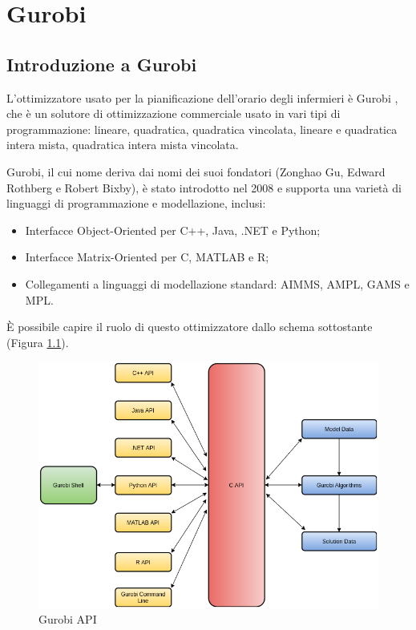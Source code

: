 \chapter{Gurobi}

\section{Introduzione a Gurobi}
L'ottimizzatore usato per la pianificazione dell'orario degli infermieri è Gurobi \cite{ref:Gurobi}, che è un solutore di ottimizzazione commerciale usato in vari tipi di programmazione: lineare, quadratica, quadratica vincolata, lineare e quadratica intera mista, quadratica intera mista vincolata.

Gurobi, il cui nome deriva dai nomi dei suoi fondatori (Zonghao Gu, Edward Rothberg e Robert Bixby), è stato introdotto nel 2008 e supporta una varietà di linguaggi di programmazione e modellazione, inclusi:
\begin{itemize}
\item Interfacce Object-Oriented per C++, Java, .NET e Python;
\item Interfacce Matrix-Oriented per C, MATLAB e R;
\item Collegamenti a linguaggi di modellazione standard: AIMMS, AMPL, GAMS e MPL.
\end{itemize}

È possibile capire il ruolo di questo ottimizzatore dallo schema sottostante (Figura \ref{fig:Gurobi}).
\begin{figure}[!h]
		\centering
		\includegraphics[scale=0.5]{img/gurobi_c.png}
		\caption{Gurobi API}
		\label{fig:Gurobi}
\end{figure}

